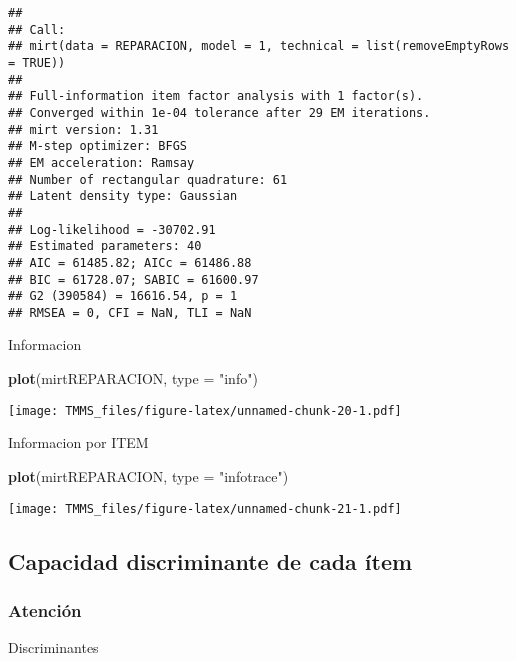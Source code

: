 \documentclass[
  10pt,
  spanish,
]{article}
\newenvironment{Shaded}{\begin{snugshade}}{\end{snugshade}}
\newcommand{\DataTypeTok}[1]{\textcolor[rgb]{0.13,0.29,0.53}{#1}}
\newcommand{\KeywordTok}[1]{\textcolor[rgb]{0.13,0.29,0.53}{\textbf{#1}}}
\newcommand{\NormalTok}[1]{#1}
\newcommand{\OperatorTok}[1]{\textcolor[rgb]{0.81,0.36,0.00}{\textbf{#1}}}
\newcommand{\StringTok}[1]{\textcolor[rgb]{0.31,0.60,0.02}{#1}}
\begin{document}
\begin{verbatim}
## 
## Call:
## mirt(data = REPARACION, model = 1, technical = list(removeEmptyRows = TRUE))
## 
## Full-information item factor analysis with 1 factor(s).
## Converged within 1e-04 tolerance after 29 EM iterations.
## mirt version: 1.31 
## M-step optimizer: BFGS 
## EM acceleration: Ramsay 
## Number of rectangular quadrature: 61
## Latent density type: Gaussian 
## 
## Log-likelihood = -30702.91
## Estimated parameters: 40 
## AIC = 61485.82; AICc = 61486.88
## BIC = 61728.07; SABIC = 61600.97
## G2 (390584) = 16616.54, p = 1
## RMSEA = 0, CFI = NaN, TLI = NaN
\end{verbatim}

Informacion

\begin{Shaded}
\begin{Highlighting}[]
\KeywordTok{plot}\NormalTok{(mirtREPARACION, }\DataTypeTok{type =} \StringTok{"info"}\NormalTok{)}
\end{Highlighting}
\end{Shaded}

\texttt{[image: TMMS\_files/figure-latex/unnamed-chunk-20-1.pdf]}

Informacion por ITEM

\begin{Shaded}
\begin{Highlighting}[]
\KeywordTok{plot}\NormalTok{(mirtREPARACION, }\DataTypeTok{type =} \StringTok{"infotrace"}\NormalTok{)}
\end{Highlighting}
\end{Shaded}

\texttt{[image: TMMS\_files/figure-latex/unnamed-chunk-21-1.pdf]}

\hypertarget{capacidad-discriminante-de-cada-uxedtem}{%
\subsection{Capacidad discriminante de cada
ítem}\label{capacidad-discriminante-de-cada-uxedtem}}

\hypertarget{atenciuxf3n-1}{%
\subsubsection{Atención}\label{atenciuxf3n-1}}

Discriminantes

\begin{Shaded}
\end{Shaded}
\end{document}
